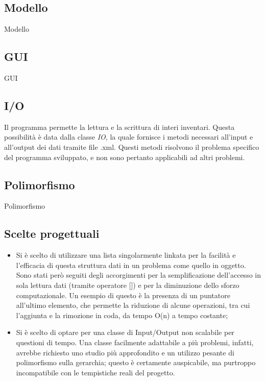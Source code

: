 \subsection{Modello}
Modello

\subsection{GUI}
GUI

\subsection{I/O}
Il programma permette la lettura e la scrittura di interi inventari. Questa possibilità è data dalla classe \textit{IO}, la quale fornisce i metodi necessari all'input e all'output dei dati tramite file .xml. Questi metodi risolvono il problema specifico del programma sviluppato, e non sono pertanto applicabili ad altri problemi.

\subsection{Polimorfismo}
Polimorfismo

\subsection{Scelte progettuali}
\begin{itemize}
\item Si è scelto di utilizzare una lista singolarmente linkata per la facilità e l'efficacia di questa struttura dati in un problema come quello in oggetto. Sono stati però seguiti degli accorgimenti per la semplificazione dell'accesso in sola lettura dati (tramite operatore []) e per la diminuzione dello sforzo computazionale. Un esempio di questo è la presenza di un puntatore all'ultimo elemento, che permette la riduzione di alcune operazioni, tra cui l'aggiunta e la rimozione in coda, da tempo O(n) a tempo costante;
\item Si è scelto di optare per una classe di Input/Output non scalabile per questioni di tempo. Una classe facilmente adattabile a più problemi, infatti, avrebbe richiesto uno studio più approfondito e un utilizzo pesante di polimorfismo sulla gerarchia; questo è certamente auspicabile, ma purtroppo incompatibile con le tempistiche reali del progetto.
\end{itemize}
